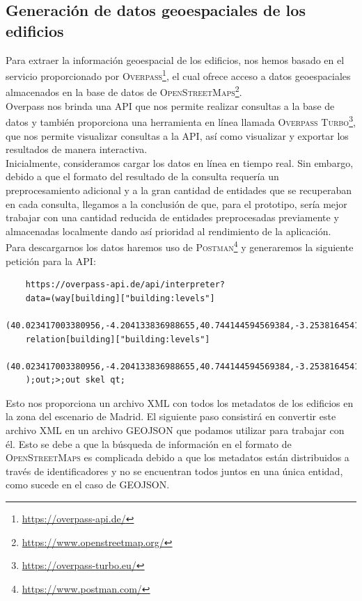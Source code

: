 \documentclass[a4paper, 11pt]{book}
\begin{document}
\subsection{Generación de datos geoespaciales de los edificios}
\label{subsec:buildingData}
Para extraer la información geoespacial de los edificios, nos hemos basado en el servicio proporcionado por \textsc{Overpass}\footnote{\url{https://overpass-api.de/}}, el cual ofrece acceso a datos geoespaciales almacenados en la base de datos de \textsc{OpenStreetMaps}\footnote{\url{https://www.openstreetmap.org/}}. \\
Overpass nos brinda una \textsc{API} que nos permite realizar consultas a la base de datos y también proporciona una herramienta en línea llamada \textsc{Overpass Turbo}\footnote{\url{https://overpass-turbo.eu/}}, que nos permite visualizar consultas a la \textsc{API}, así como visualizar y exportar los resultados de manera interactiva.\\
Inicialmente, consideramos cargar los datos en línea en tiempo real. Sin embargo, debido a que el formato del resultado de la consulta requería un preprocesamiento adicional y a la gran cantidad de entidades que se recuperaban en cada consulta, llegamos a la conclusión de que, para el prototipo, sería mejor trabajar con una cantidad reducida de entidades preprocesadas previamente y almacenadas localmente dando así prioridad al rendimiento de la aplicación.\\
Para descargarnos los datos haremos uso de \textsc{Postman}\footnote{\url{https://www.postman.com/}} y generaremos la siguiente petición para la \textsc{API}:

 \label{manual:consultaEdificios}
{\scriptsize
    \begin{verbatim}
    https://overpass-api.de/api/interpreter?
    data=(way[building]["building:levels"]
    (40.023417003380956,-4.204133836988655,40.744144594569384,-3.253816454176155);
    relation[building]["building:levels"]
    (40.023417003380956,-4.204133836988655,40.744144594569384,-3.253816454176155);
    );out;>;out skel qt;
    \end{verbatim}
}
Esto nos proporciona un archivo \textsc{XML} con todos los metadatos de los edificios en la zona del escenario de Madrid. El siguiente paso consistirá en convertir este archivo \textsc{XML} en un archivo \textsc{GEOJSON} que podamos utilizar para trabajar con él. Esto se debe a que la búsqueda de información en el formato de \textsc{OpenStreetMaps} es complicada debido a que los metadatos están distribuidos a través de identificadores y no se encuentran todos juntos en una única entidad, como sucede en el caso de \textsc{GEOJSON}.
\end{document}
